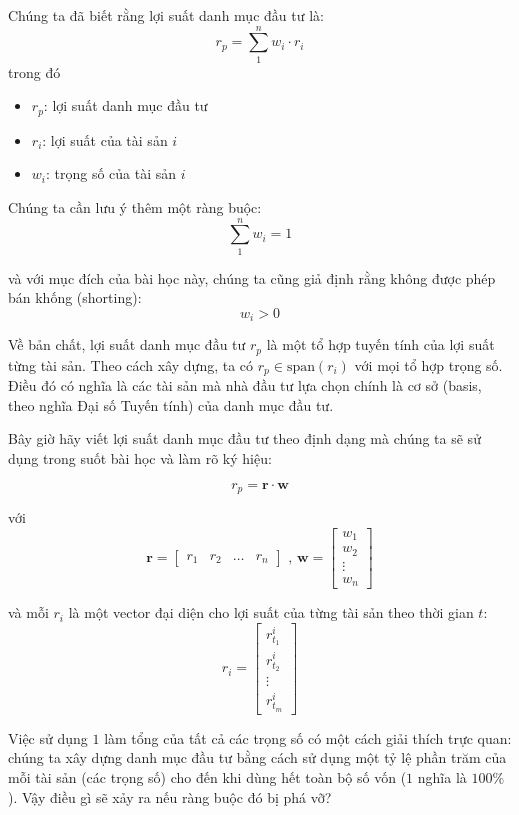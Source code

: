 Chúng ta đã biết rằng lợi suất danh mục đầu tư là:
$$
r_{p} = \sum_{1}^{n} w_{i} \cdot r_{i}
$$
trong đó
\begin{itemize}
  \item $r_{p}$: lợi suất danh mục đầu tư
  \item $r_{i}$: lợi suất của tài sản $i$
  \item $w_{i}$: trọng số của tài sản $i$
\end{itemize}

Chúng ta cần lưu ý thêm một ràng buộc:
$$
\sum_{1}^{n} w_{i} = 1
$$

và với mục đích của bài học này, chúng ta cũng giả định rằng không được phép bán khống (shorting):
$$
w_{i} > 0
$$

Về bản chất, lợi suất danh mục đầu tư $r_{p}$ là một tổ hợp tuyến tính của lợi suất từng tài sản. Theo cách xây dựng, ta có $r_{p} \in \text{span}(r_{i})$ với mọi tổ hợp trọng số. Điều đó có nghĩa là các tài sản mà nhà đầu tư lựa chọn chính là cơ sở (basis, theo nghĩa Đại số Tuyến tính) của danh mục đầu tư.

Bây giờ hãy viết lợi suất danh mục đầu tư theo định dạng mà chúng ta sẽ sử dụng trong suốt bài học và làm rõ ký hiệu:

$$
r_{p} = \mathbf{r} \cdot \mathbf{w}
$$

với
$$ \mathbf{r} = \begin{bmatrix} r_1 & r_2 & \dots & r_n \end{bmatrix} \text{ , } \mathbf{w} = \begin{bmatrix} w_1 \\ w_2 \\ \vdots \\ w_n \end{bmatrix}$$

và mỗi $r_{i}$ là một vector đại diện cho lợi suất của từng tài sản theo thời gian $t$:
$$
r_{i} = \begin{bmatrix} r^i_{t_{1}} \\ r^i_{t_{2}} \\ \vdots \\ r^i_{t_{m}} \end{bmatrix}
$$

Việc sử dụng $1$ làm tổng của tất cả các trọng số có một cách giải thích trực quan: chúng ta xây dựng danh mục đầu tư bằng cách sử dụng một tỷ lệ phần trăm của mỗi tài sản (các trọng số) cho đến khi dùng hết toàn bộ số vốn ($1$ nghĩa là $100\%$). Vậy điều gì sẽ xảy ra nếu ràng buộc đó bị phá vỡ?

